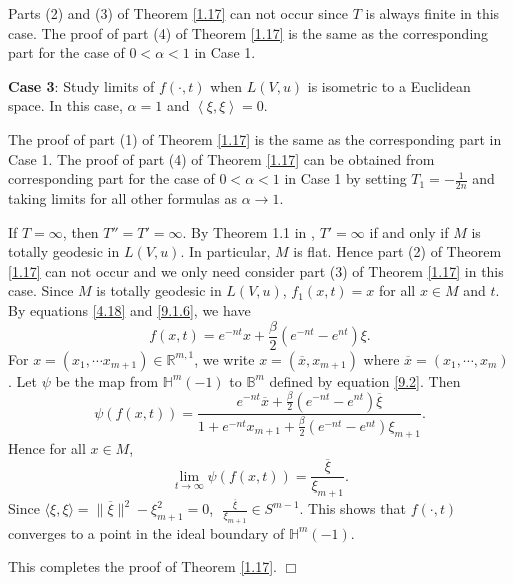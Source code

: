 \documentclass[12pt]{article}
\begin{document}
Parts (2) and (3) of Theorem \ref{1.17} can not occur since $T$ is always finite in this case.
The proof of part (4) of Theorem \ref{1.17} is the same as the corresponding part for the case of $0<\alpha<1$ in Case 1.

\vspace{6pt}

\textbf{Case 3}: Study limits of $f(\cdot, t)$ when $L(V,u)$ is isometric to a Euclidean space.
 In this case, $\alpha=1$ and $\left<\xi, \xi \right>=0$.

 The proof of part (1) of Theorem \ref{1.17}  is the same as the corresponding part in Case 1.
 The proof of part (4)  of Theorem \ref{1.17} can be obtained from corresponding part for the case of $0 < \alpha < 1$ in Case 1 by setting $T_1 = - \frac{1}{2n}$ and taking limits for all other formulas as $\alpha \rightarrow 1$.


If $T = \infty$, then $T''=T'=\infty$. By Theorem 1.1 in \cite{X.CT},  $T'=\infty$ if and only if $M$ is totally geodesic in $L(V,u)$. In particular, $M$ is flat.  Hence part (2)  of Theorem \ref{1.17} can not  occur and we only need consider part (3) of  Theorem \ref{1.17} in this case. %
Since $M$ is totally geodesic in $L(V,u)$, $f_1(x,t)=x$ for all $x \in M$ and $t$. By equations \eqref{4.18} and \eqref{9.1.6}, we have
\[ f(x, t) = e^{-nt} x + \frac{\beta}{2} (e^{-nt}-e^{nt}) \xi.\]
For $x=(x_1, \cdots x_{m+1}) \in \mathbb{R}^{m,1}$, we write
$x=(\overline{x}, x_{m+1})$ where $\overline{x}=(x_1, \cdots, x_m)$.
Let $\psi$ be the map from $\mathbb{H}^{m}(-1)$ to $\mathbb{B}^m$ defined by equation \eqref{9.2}.
Then
\[ \psi(f(x, t)) = \frac{ e^{-nt} \overline{x} + \frac{\beta}{2} (e^{-nt}-e^{nt}) \overline{\xi}}
                          {1+ e^{-nt} x_{m+1} + \frac{\beta}{2} (e^{-nt}-e^{nt}) \xi_{m+1}}. \]
Hence for all $x \in M$,
\[ \lim_{t \rightarrow \infty} \psi(f(x, t)) = \frac{\overline{\xi}}{\xi_{m+1}}.\]
Since $\langle\xi, \xi\rangle= \|\overline{\xi}\|^2 - \xi_{m+1}^2 =0$, $\, \, \frac{\overline{\xi}}{\xi_{m+1}} \in S^{m-1}$.
This shows that $f(\cdot, t)$ converges to a point in the ideal boundary of  $\mathbb{H}^{m}(-1)$.

This completes the proof of Theorem \ref{1.17}.
$\Box$
\end{document}
